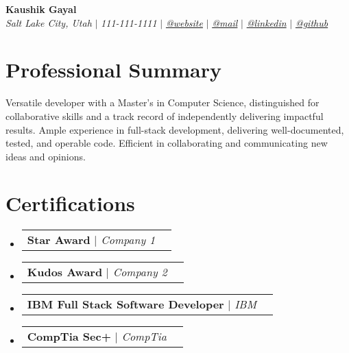 \documentclass[letterpaper,10pt]{article}
\makeatletter
\newcommand{\sectionspace}{
\vspace{-20pt}
}
\newcommand{\subheadingtitlevspace}{
\vspace{-3pt}
}
\newcommand{\titleItem}[1]{
  \textbf{#1}
}
\newcommand{\resumeProjectHeading}[2]{
    \item
    \begin{tabular*}{0.97\textwidth}{l@{\extracolsep{\fill}}r}
      #1 & \textit{ #2} \\
    \end{tabular*}\vspace{-9pt}
}
\newcommand{\resumeSubHeadingListStart}{\subheadingtitlevspace\begin{itemize}[leftmargin=0.15in, label={}]}
\newcommand{\resumeSubHeadingListEnd}{\end{itemize}}
\makeatother
\begin{document}

\begin{flushleft}
    \textbf{\large Kaushik Gayal} \\    
    \textit{Salt Lake City, Utah} $|$ 
    \textit{111-111-1111} $|$  
    \href{https://kaushik.gayal.dev}{{\textit{@website}}} $|$
    \href{mailto:gayal.kaushik@gmail.com}{{\textit{@mail}}} $|$ 
    \href{https://www.linkedin.com/in/kaushik-gayal-02a57316/}{{\textit{@linkedin}}} $|$
    \href{https://github.com/koshikg}{{\textit{@github}}}
    \vspace{-8pt}
\end{flushleft}


\section{Professional Summary}
\vspace{-3pt}
\begin{itemize}[leftmargin=0.15in, label={}]
    {\item{
     {Versatile developer with a Master's in Computer Science, distinguished for collaborative skills and a track record of independently delivering impactful results. Ample experience in full-stack development, delivering well-documented, tested, and operable code. Efficient in collaborating and communicating new ideas and opinions.} \\      
    }}
 \end{itemize}
 \sectionspace



\section{Certifications}
    \resumeSubHeadingListStart
      \resumeProjectHeading
          {\titleItem{Star Award} \emph{ $|$ Company 1}}{}
      \resumeProjectHeading
          {\titleItem{Kudos Award} \emph{ $|$ Company 2}}{}
      \resumeProjectHeading
          {\titleItem{IBM Full Stack Software Developer} \emph{$|$ IBM}}{}
          \resumeProjectHeading
          {\titleItem{CompTia Sec+} \emph{$|$ CompTia}}{}
    \resumeSubHeadingListEnd
\end{document}
